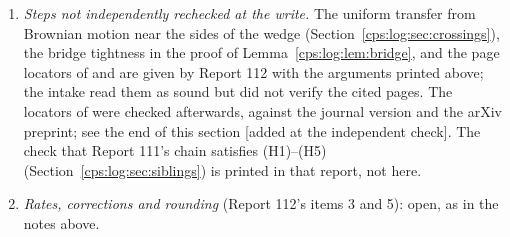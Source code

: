 \documentclass[11pt,letterpaper]{article}
\numberwithin{equation}{section}
\theoremstyle{remark}\newtheorem{remark}[theorem]{Remark}
\newcommand{\repo}[1]{\nolinkurl{#1}}
\begin{document}
\begin{enumerate}
\begin{enumerate}[label=\textup{Q\arabic*.},ref=Q\arabic*]
 there. What is the exponent, if any, at such endpoints?
 \textup{[}Dated note, 5~October 2026: A279571's walk is an example
 (\repo{a279571-inversion-cone-walk}, Remarks~26.1 and~26.4): at both phases of the origin the
 stationary dual has no seed, and the kernel from any state into the origin vanishes for every
 $n\ge2$ (from $o$, for every $n\ge1$), so there is no exponent there. The question remains open in
 general.\textup{]}
\item\label{cps:log:q:unchecked} \emph{Steps not independently rechecked at the write.} The uniform
 transfer from Brownian motion near the sides of the wedge (Section~\ref{cps:log:sec:crossings}),
 the bridge tightness in the proof of Lemma~\ref{cps:log:lem:bridge}, and the page locators of
 \cite[Theorem 2.1(ii)]{Whitt} and \cite[Theorem 6, Corollary 1]{FR} are given by Report 112 with
 the arguments printed above; the intake read them as sound but did not verify the cited pages.
 The locators of \cite{FR} were checked afterwards, against the journal version and the arXiv
 preprint; see the end of this section \textup{[}added at the independent check\textup{]}.
 The check that Report 111's chain satisfies (H1)--(H5)
 (Section~\ref{cps:log:sec:siblings}) is printed in that report, not here.
\item\label{cps:log:q:rates} \emph{Rates, corrections and rounding} (Report 112's items 3 and 5):
 open, as in the notes above.
\end{enumerate}
\end{enumerate}
\end{document}
